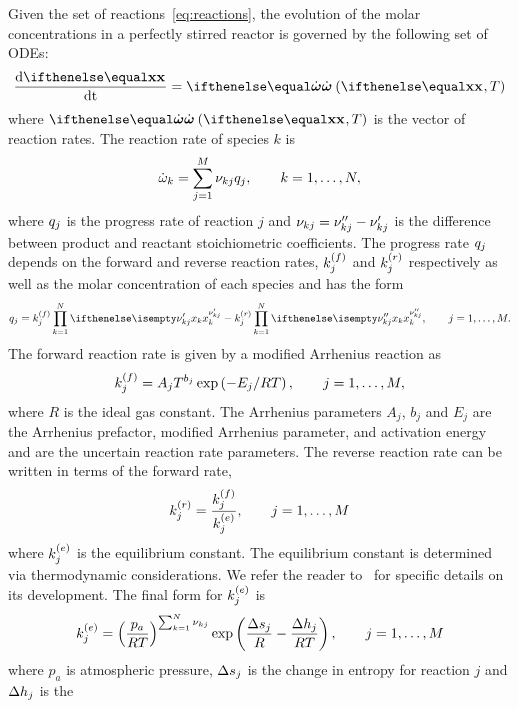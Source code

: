 \documentclass[fontsize=12pt, %
               paper=a4, %
               hyperref]{report}
\begin{document}
  Given the set of reactions~\eqref{eq:reactions}, the evolution of the
  molar concentrations in a perfectly stirred reactor is governed by the
  following set of ODEs:
  \begin{align}
     \odeone{\xc}{\time} = \rr\lr{\xc, T} \label{eq:ode_reactions}
  \end{align}
  where $\rr\lr{\xc, T}$ is the vector of reaction rates.  The reaction 
  rate of species $k$ is
  \begin{align}
    \dot{\omega}_{k} = \sum_{j=1}^{M}{\nu_{kj}q_{j}}, \qquad k = 1,\ldots,N,
  \end{align}
  where $q_{j}$ is the progress rate of reaction $j$ and $\nu_{kj} =
  \nu_{kj}^{\prime\prime} - \nu_{kj}^{\prime}$ is the difference between product and reactant
  stoichiometric coefficients.  The progress rate $q_{j}$ depends on
  the forward and reverse reaction rates, $k_{j}^{\left(f\right)}$ and $k_{j}^{\left(r\right)}$ respectively
  as well as the molar concentration of each species and has the form
  \begin{align}
    \pr{j} = \kf\prod_{k=1}^{N}{\displaystyle\xk{k}{\nur}} - 
             \kr\prod_{k=1}^{N}{\displaystyle\xk{k}{\nup}}, 
    \qquad j = 1,\ldots,M.
  \end{align}
  The forward reaction rate is given by a modified Arrhenius 
  reaction as
  \begin{align}
    k_{j}^{\left(f\right)} = A_{j}T^{b_{j}}\exp\left(-E_{j}/RT\right), 
    \qquad j = 1,\ldots,M, 
    \label{eq:arrhenius}
  \end{align}
  where $R$ is the ideal gas constant.  The Arrhenius parameters $A_{j}$, $b_{j}$ and $E_{j}$ 
  are the Arrhenius prefactor, modified Arrhenius parameter, and activation energy and are the 
  uncertain reaction rate parameters.  The reverse reaction rate can be written in terms of the 
  forward rate,
  \begin{align}
    k_{j}^{\left(r\right)} = \frac{k_{j}^{\left(f\right)}}{k_{j}^{\left(e\right)}}, \qquad j = 1,\ldots,M
  \end{align}
  where $k_{j}^{\left(e\right)}$ is the equilibrium constant.  The equilibrium 
  constant is determined via thermodynamic considerations.  We 
  refer the reader to~\cite[Ch.9.3]{kee2005chemically} for specific 
  details on its development.  The final form for $k_{j}^{\left(e\right)}$ is 
  \begin{align}
    k_{j}^{\left(e\right)} = \left(\frac{p_{a}}{RT}\right)^{\sum_{k=1}^{N}{\nu_{kj}}}
          \exp\left(\frac{\Delta s_{j}}{R} - \frac{\Delta h_{j}}{RT}\right), 
    \qquad j = 1,\ldots,M
  \end{align}
  where $p_{a}$ is atmospheric pressure, $\Delta s_{j}$ is the 
  change in entropy for reaction $j$ and $\Delta h_{j}$ is the 
\end{document}
